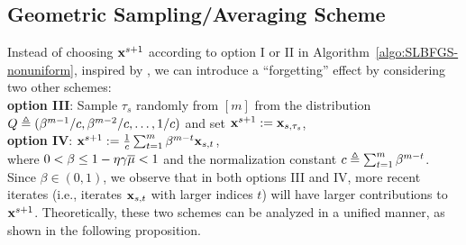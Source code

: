 \documentclass[10pt,twocolumn,journal]{IEEEtran}
\begin{document}
\subsection{Geometric Sampling/Averaging Scheme}\label{sec:exp_samp_ave}
Instead of %
choosing $\mathbf{x}^{s+1}$ according to option I or II in Algorithm~\ref{algo:SLBFGS-nonuniform}, inspired by \cite{Konecny_13}, 
we can introduce a ``forgetting'' effect by considering two other schemes:\\[.1cm]
{\bf option III}: Sample $\tau_s$ randomly from $[m]$ from the  distribution $Q\triangleq (\beta^{m-1}/c,\beta^{m-2}/c,\ldots,1/c)$ and set $\mathbf{x}^{s+1}:=\mathbf{x}_{s,\tau_s}$,\\[.1cm]
{\bf option IV}: $\mathbf{x}^{s+1} := \frac{1}{c}\sum_{t=1}^m{\beta^{m-t}}\mathbf{x}_{s,t}$,\\[.1cm]
where $0<\beta\le 1-\eta\gamma\overline{\mu}<1$ and the normalization constant $c\triangleq \sum_{t=1}^m{\beta^{m-t}}$. Since $\beta\in(0,1)$, we observe that in both options III and IV,  %
more recent iterates (i.e., iterates $\mathbf{x}_{s,t}$ with larger indices $t$) will have larger contributions to $\mathbf{x}^{s+1}$. 
Theoretically, these two schemes can be analyzed in a unified manner, as shown in the following proposition. %
\end{document}
